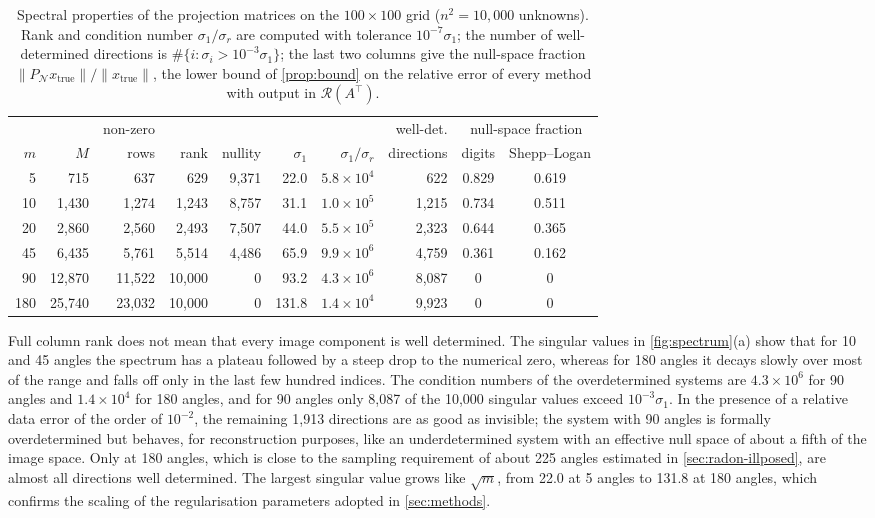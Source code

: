 \documentclass[11pt,a4paper]{article}
\numberwithin{equation}{section}
\theoremstyle{remark}
\newcommand{\RR}{\mathcal{R}}
\newcommand{\NN}{\mathcal{N}}
\newcommand{\xt}{x_{\mathrm{true}}}
\newcommand{\T}{\top}
\begin{document}
\begin{table}[t]
\centering
\caption{Spectral properties of the projection matrices on the $100\times100$ grid ($n^2=10{,}000$ unknowns). Rank and condition number $\sigma_1/\sigma_r$ are computed with tolerance $10^{-7}\sigma_1$; the number of well-determined directions is $\#\{i:\sigma_i>10^{-3}\sigma_1\}$; the last two columns give the null-space fraction $\|P_{\NN}\xt\|/\|\xt\|$, the lower bound of \cref{prop:bound} on the relative error of every method with output in $\RR(A^\T)$.}\label{tab:spectrum}
\small
\setlength{\tabcolsep}{4.5pt}
\begin{tabular}{rrrrrrrrcc}
\toprule
 & & non-zero & & & & & well-det. & \multicolumn{2}{c}{null-space fraction}\\
\cmidrule(lr){9-10}
$m$ & $M$ & rows & rank & nullity & $\sigma_1$ & $\sigma_1/\sigma_r$ & directions & digits & Shepp--Logan\\
\midrule
5 & 715 & 637 & 629 & 9{,}371 & 22.0 & $5.8\times10^{4}$ & 622 & 0.829 & 0.619 \\
10 & 1{,}430 & 1{,}274 & 1{,}243 & 8{,}757 & 31.1 & $1.0\times10^{5}$ & 1{,}215 & 0.734 & 0.511 \\
20 & 2{,}860 & 2{,}560 & 2{,}493 & 7{,}507 & 44.0 & $5.5\times10^{5}$ & 2{,}323 & 0.644 & 0.365 \\
45 & 6{,}435 & 5{,}761 & 5{,}514 & 4{,}486 & 65.9 & $9.9\times10^{6}$ & 4{,}759 & 0.361 & 0.162 \\
90 & 12{,}870 & 11{,}522 & 10{,}000 & 0 & 93.2 & $4.3\times10^{6}$ & 8{,}087 & 0 & 0 \\
180 & 25{,}740 & 23{,}032 & 10{,}000 & 0 & 131.8 & $1.4\times10^{4}$ & 9{,}923 & 0 & 0 \\
\bottomrule
\end{tabular}
\end{table}

Full column rank does not mean that every image component is well determined. The singular values in \cref{fig:spectrum}(a) show that for 10 and 45 angles the spectrum has a plateau followed by a steep drop to the numerical zero, whereas for 180 angles it decays slowly over most of the range and falls off only in the last few hundred indices. The condition numbers of the overdetermined systems are $4.3\times10^6$ for 90 angles and $1.4\times10^4$ for 180 angles, and for 90 angles only 8{,}087 of the 10{,}000 singular values exceed $10^{-3}\sigma_1$. In the presence of a relative data error of the order of $10^{-2}$, the remaining 1{,}913 directions are as good as invisible; the system with 90 angles is formally overdetermined but behaves, for reconstruction purposes, like an underdetermined system with an effective null space of about a fifth of the image space. Only at 180 angles, which is close to the sampling requirement of about 225 angles estimated in \cref{sec:radon-illposed}, are almost all directions well determined. The largest singular value grows like $\sqrt m$, from 22.0 at 5 angles to 131.8 at 180 angles, which confirms the scaling of the regularisation parameters adopted in \cref{sec:methods}.
\end{document}
